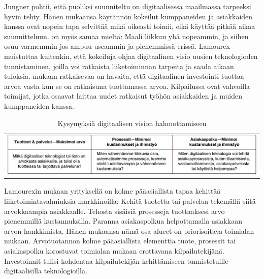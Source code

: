 \documentclass[finnish,12pt,a4paper,pdftex]{article}
\begin{document}
Jungner \citeyearpar{jungner} pohtii, että puoliksi suunniteltu on digitaalisessa maailmassa tarpeeksi hyvin tehty. Hänen mukaansa käytännön kokeilut kumppaneiden ja asiakkaiden kanssa ovat nopein tapa selvittää mikä oikeasti toimii, eikä käyttää pitkää aikaa suunnitteluun. \citeauthor{devops} \citeyearpar{devops} on myös samaa mieltä: Maali liikkuu yhä nopeammin, ja siihen osuu varmemmin jos ampuu useammin ja pienemmissä erissä. Lamourex \citeyearpar{lamoureux} muistuttaa kuitenkin, että kokeiluja ohjaa digitaalinen visio uusien teknologioden tunnistaminen, joilla voi ratkaista liiketoiminnan tarpeita ja saada aikaan tuloksia. \citeauthor{gandhi} \citeyearpar{gandhi} mukaan ratkaisevaa on havaita, että digitaalinen investointi tuottaa arvoa vasta kun se on ratkaisuna tuottamassa arvoa. Kilpailussa ovat vahvoilla toimijat, jotka osaavat laittaa uudet ratkaisut työhön asiakkaiden ja muiden kumppaneiden kanssa.

\begin{table}[h!]
    \centering
    \begin{tabular}{l}
       \includegraphics[scale=0.45]{images/priorisointi.pdf}
    \end{tabular}
    \caption{Kysymyksiä digitaalisen vision hahmottamiseen \citep{lamoureux}}
    \label{tab:digkys}
\end{table}

Lamourexin \citeyear{lamoureux} mukaan yrityksellä on kolme pääasiallista tapaa kehittää liiketoimintavalmiuksia markkinoilla: Kehitä tuotetta tai palvelua tekemällä siitä arvokkaampia asiakkaalle. Tehosta sisäisiä prosesseja tuottaaksesi arvo pienemmillä kustannuksilla. Paranna asiakaspolkua helpottamalla asiakkaan arvon hankkimista. Hänen mukaansa nämä osa-alueet on priorisoitava toimialan mukaan. Arvotuotannon kolme pääasiallista elementtia tuote, prosessit tai asiakaspolku korostuvat toimialan mukaan erottavana kilpailutekijänä. Investoinnit tulisi kohdentaa kilpailutekijän kehittämiseen tunnistetuille digitaalisilla teknologioilla.
\end{document}
